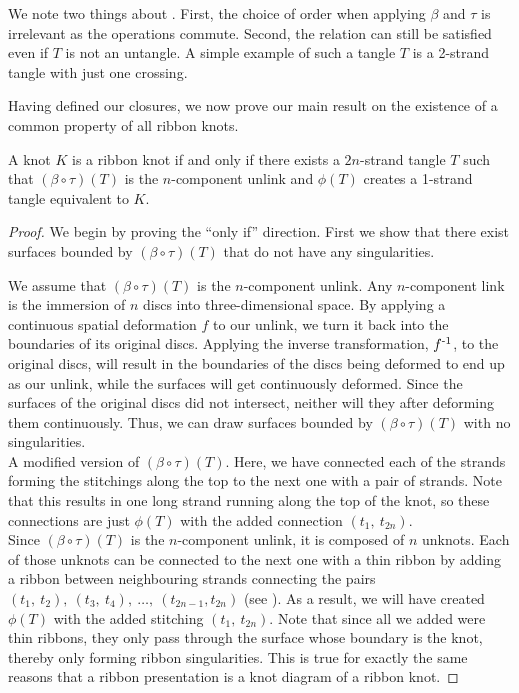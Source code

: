 \begin{paper}
We note two things about \eqUnlink.
First, the choice of order when applying $\beta$ and $\tau$ is irrelevant as the
operations commute.
Second, the relation \eqUnlink can still be satisfied even if $T$ is not an
untangle.
A simple example of such a tangle $T$ is a 2-strand tangle with just one
crossing.

Having defined our closures, we now prove our main result on the existence of a
common property of all ribbon knots.

{A knot $K$ is a ribbon knot if and only if there exists a $2n$-strand tangle
$T$ such that $(\beta\circ\tau)(T)$ is the $n$-component unlink and $\phi(T)$
creates a 1-strand tangle equivalent to $K$.}
\begin{proof}
We begin by proving the ``only if'' direction.
First we show that there exist surfaces bounded by $(\beta\circ\tau)(T)$ that do
not have any singularities.

We assume that $(\beta\circ\tau)(T)$ is the $n$-component unlink.
Any $n$-component link is the immersion of $n$ discs into three-dimensional
space.
By applying a continuous spatial deformation $f$ to our unlink, we turn it back
into the boundaries of its original discs.
Applying the inverse transformation, $f^{\text-1}$, to the original discs, will
result in the boundaries of the discs being deformed to end up as our unlink,
while the surfaces will get continuously deformed.
Since the surfaces of the original discs did not intersect, neither will they
after deforming them continuously.
Thus, we can draw surfaces bounded by $(\beta\circ\tau)(T)$ with no
singularities.\\

{A modified version of $(\beta\circ\tau)(T)$.
Here, we have connected each of the strands forming the stitchings along the top
to the next one with a pair of strands.
Note that this results in one long strand running along the top of the knot, so
these connections are just $\phi(T)$ with the added connection
$(t_1,~t_{2n})$.}\\

Since $(\beta\circ\tau)(T)$ is the $n$-component unlink, it is composed of $n$
unknots.
Each of those unknots can be connected to the next one with a thin ribbon by
adding a ribbon between neighbouring strands connecting the pairs
$(t_1,~t_2),~(t_3,~t_4),~\dots,~(t_{2n-1},t_{2n})$ (see \figProof).
As a result, we will have created $\phi(T)$ with the added stitching
$(t_1,~t_{2n})$.
Note that since all we added were thin ribbons, they only pass through the
surface whose boundary is the knot, thereby only forming ribbon singularities.
This is true for exactly the same reasons that a ribbon presentation is a knot
diagram of a ribbon knot.


\end{proof}
\end{paper}
